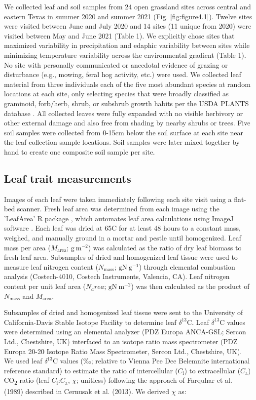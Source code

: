     We collected leaf and soil samples from 24 open grassland sites across central and eastern Texas in summer 2020 and summer 2021 (Fig. \ref{fig:figure4.1}). Twelve sites were visited between June and July 2020 and 14 sites (11 unique from 2020) were visited between May and June 2021 (Table 1). We explicitly chose sites that maximized variability in precipitation and edaphic variability between sites while minimizing temperature variability across the environmental gradient (Table 1). No site with personally communicated or anecdotal evidence of grazing or disturbance (e.g., mowing, feral hog activity, etc.) were used. We collected leaf material from three individuals each of the five most abundant species at random locations at each site, only  selecting species that were broadly classified as graminoid, forb/herb, shrub, or subshrub growth habits per the USDA PLANTS database . All collected leaves were fully expanded with no visible herbivory or other external damage and also free from shading by nearby shrubs or trees. Five soil samples were collected from 0-15cm below the soil surface at each site near the leaf collection sample locations. Soil samples were later mixed together by hand to create one composite soil sample per site.

    \subsection{Leaf trait measurements}
    Images of each leaf were taken immediately following each site visit using a flat-bed scanner. Fresh leaf area was determined from each image using the 'LeafArea' R package , which automates leaf area calculations using ImageJ software . Each leaf was dried at 65\textdegree{}C for at least 48 hours to a constant mass, weighed, and manually ground in a mortar and pestle until homogenized. Leaf mass per area ($M_\mathrm{area}$; $\mathrm{g\ m^{-2}}$) was calculated as the ratio of dry leaf biomass to fresh leaf area. Subsamples of dried and homogenized leaf tissue were used to measure leaf nitrogen content ($N_\mathrm{mass}$; $\mathrm{gN\ g^{-1}}$) through elemental combustion analysis (Costech-4010, Costech Instruments, Valencia, CA). Leaf nitrogen content per unit leaf area ($N_area$; $\mathrm{gN\ m^{-2}}$) was then calculated as the product of $N_\mathrm{mass}$ and $M_\mathrm{area}$.
    
    Subsamples of dried and homogenized leaf tissue were sent to the University of California-Davis Stable Isotope Facility to determine leaf $\delta^{13}$C. Leaf $\delta^{13}$C values were determined using an elemental analyzer (PDZ Europa ANCA-GSL; Sercon Ltd., Chestshire, UK) interfaced to an isotope ratio mass spectrometer (PDZ Europa 20-20 Isotope Ratio Mass Spectrometer, Sercon Ltd., Chestshire, UK). We used leaf $\delta^{13}$C values (‰; relative to Vienna Pee Dee Belemnite international reference standard) to estimate the ratio of intercellular ($C_\mathrm{i}$) to extracellular ($C_\mathrm{a}$) CO\textsubscript{2} ratio (leaf $C_\mathrm{i}$:$C_\mathrm{a}$, $\chi$; unitless) following the approach of Farquhar et al. (1989) described in Cernusak et al. (2013). We derived $\chi$ as:

